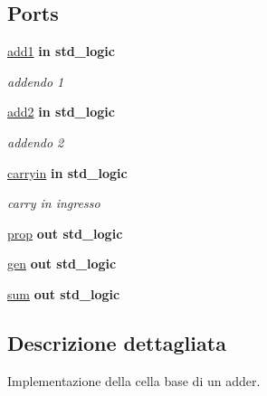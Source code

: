 \subsection*{Ports}
 \begin{DoxyCompactItemize}
\item 
\hyperlink{group___base_cell_ga2b16ee1ce0d8ffb8f85ccea13f8ba38d}{add1}  {\bfseries {\bfseries \textcolor{vhdlchar}{in}\textcolor{vhdlchar}{ }}} {\bfseries \textcolor{vhdlchar}{std\+\_\+logic}\textcolor{vhdlchar}{ }} 
\begin{DoxyCompactList}\small\item\em addendo 1 \end{DoxyCompactList}\item 
\hyperlink{group___base_cell_gac3ebb689e34fc5e7657726b18d8b5369}{add2}  {\bfseries {\bfseries \textcolor{vhdlchar}{in}\textcolor{vhdlchar}{ }}} {\bfseries \textcolor{vhdlchar}{std\+\_\+logic}\textcolor{vhdlchar}{ }} 
\begin{DoxyCompactList}\small\item\em addendo 2 \end{DoxyCompactList}\item 
\hyperlink{group___base_cell_gaa556a73dc4a4de1a0d662b25adbcbe33}{carryin}  {\bfseries {\bfseries \textcolor{vhdlchar}{in}\textcolor{vhdlchar}{ }}} {\bfseries \textcolor{vhdlchar}{std\+\_\+logic}\textcolor{vhdlchar}{ }} 
\begin{DoxyCompactList}\small\item\em carry in ingresso \end{DoxyCompactList}\item 
\hyperlink{group___base_cell_gac94466f3a0e3e34f0231abcf4b667ade}{prop}  {\bfseries {\bfseries \textcolor{vhdlchar}{out}\textcolor{vhdlchar}{ }}} {\bfseries \textcolor{vhdlchar}{std\+\_\+logic}\textcolor{vhdlchar}{ }} 
\item 
\hyperlink{group___base_cell_gaad65a9c9ebd4dd83c2835249a1ba2dff}{gen}  {\bfseries {\bfseries \textcolor{vhdlchar}{out}\textcolor{vhdlchar}{ }}} {\bfseries \textcolor{vhdlchar}{std\+\_\+logic}\textcolor{vhdlchar}{ }} 
\item 
\hyperlink{group___base_cell_ga0d9fc1b21b42422b12d68ad73ca8ef13}{sum}  {\bfseries {\bfseries \textcolor{vhdlchar}{out}\textcolor{vhdlchar}{ }}} {\bfseries \textcolor{vhdlchar}{std\+\_\+logic}\textcolor{vhdlchar}{ }} 
\end{DoxyCompactItemize}


\subsection{Descrizione dettagliata}
Implementazione della cella base di un adder. 



